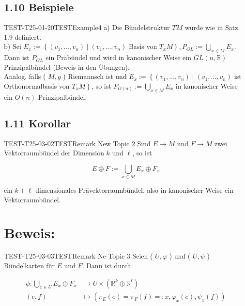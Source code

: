 \subsection*{1.10 Beispiele}
\begin{EXA}{TEST-T25-01-20}{TESTExample4}
a) Die Bündelstruktur $T M$ wurde wie in Satz 1.9 definiert.\\
b) Sei $E_{x}:=\left\{\left(v_{1}, \ldots, v_{n}\right) \mid\left(v_{1}, \ldots, v_{n}\right)\right.$ Basis von $\left.T_{x} M\right\}, P_{G L}:=\bigcup_{x \in M} E_{x}$. Dann ist $P_{G L}$ ein Präbündel und wird in kanonischer Weise ein $G L(n, \mathbb{R})$ Prinzipalbündel (Beweis in den Übungen).\\
Analog, falls ( $M, g$ ) Riemannsch ist und $E_{x}:=\left\{\left(v_{1}, \ldots, v_{n}\right) \mid\left(v_{1}, \ldots, v_{n}\right)\right.$ ist Orthonormalbasis von $\left.T_{x} M\right\}$, so ist $P_{O(n)}:=\bigcup_{x \in M} E_{x}$ in kanonischer Weise ein $O(n)$-Prinzipalbündel.
\end{EXA}

\subsection*{1.11 Korollar}
\begin{KORO}{TEST-T25-03-02}{TESTRemark New Topic 2}
Sind $E \rightarrow M$ und $F \rightarrow M$ zwei Vektorraumbündel der Dimension $k$ und $\ell$, so ist

$$
E \oplus F:=\bigcup_{x \in M} E_{x} \oplus F_{x}
$$

ein $k+\ell$-dimensionales Prävektorraumbündel, also in kanonischer Weise ein Vektorraumbündel.
\end{KORO}


\section*{Beweis:}
\begin{EXA}{TEST-T25-03-03}{TESTRemark Ne Topic 3}
Seien ( $U, \varphi$ ) und ( $U, \psi$ ) Bündelkarten für $E$ und $F$. Dann ist durch

$$
\begin{aligned}
\phi: \bigcup_{x \in U} E_{x} \oplus F_{x} & \rightarrow U \times\left(\mathbb{R}^{k} \oplus \mathbb{R}^{\ell}\right) \\
(e, f) & \mapsto\left(\pi_{E}(e)=\pi_{F}(f)=: x, \varphi_{x}(e), \psi_{x}(f)\right)
\end{aligned}
$$
\end{EXA}

